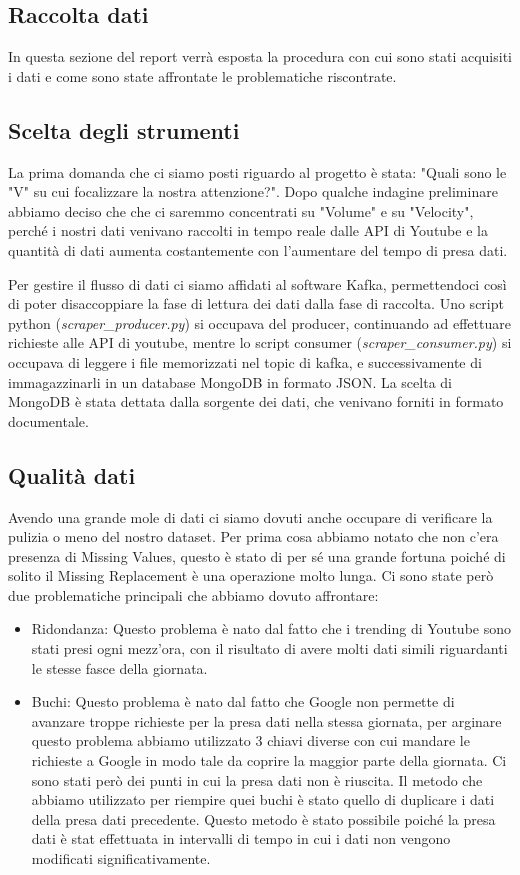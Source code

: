 \documentclass[10pt, a4paper,openany]{article}
\begin{document}
\begin{multicols}{2}
\section*{Raccolta dati}

In questa sezione del report verrà esposta la procedura con cui sono stati acquisiti i dati e come sono state affrontate le problematiche riscontrate.
\subsection*{Scelta degli strumenti}
La prima domanda che ci siamo posti riguardo al progetto è stata: "Quali sono le "V" su cui focalizzare la nostra attenzione?".
Dopo qualche indagine preliminare abbiamo deciso che che ci saremmo concentrati su "Volume" e su "Velocity", perché i nostri dati venivano raccolti in tempo reale dalle API di Youtube e la quantità di dati aumenta costantemente con l'aumentare del tempo di presa dati.

Per gestire il flusso di dati ci siamo affidati al software Kafka, permettendoci così di poter disaccoppiare la fase di lettura dei dati dalla fase di  raccolta. Uno script python (\textit{scraper\_producer.py}) si occupava del producer, continuando ad effettuare richieste alle API di youtube, mentre lo script consumer (\textit{scraper\_consumer.py}) si occupava di leggere i file memorizzati nel topic di kafka, e successivamente di immagazzinarli in un database MongoDB in formato JSON. La scelta di MongoDB è stata dettata dalla sorgente dei dati, che venivano forniti in formato documentale.
 
\subsection*{Qualità dati}

Avendo una grande mole di dati ci siamo dovuti anche occupare di verificare la pulizia o meno del nostro dataset. Per prima cosa abbiamo notato che non c'era presenza di Missing Values, questo è stato di per sé una grande fortuna poiché di solito il Missing Replacement è una operazione molto lunga.  Ci sono state però due problematiche principali che abbiamo dovuto affrontare:
\begin{itemize}
	\item Ridondanza: Questo problema è nato dal fatto che i trending di Youtube sono stati presi ogni mezz'ora, con il risultato di avere molti dati simili riguardanti le stesse fasce della giornata. 
	\item Buchi: Questo problema è nato dal fatto che Google non permette di avanzare troppe richieste per la presa dati nella stessa giornata, per arginare questo problema abbiamo utilizzato 3 chiavi diverse con cui mandare le richieste a Google in modo tale da coprire la maggior parte della giornata. Ci sono stati però dei punti in cui la presa dati non è riuscita. Il metodo che abbiamo utilizzato per riempire quei buchi è stato quello di duplicare i dati della presa dati precedente. Questo metodo è stato possibile poiché la presa dati è stat effettuata in intervalli di tempo in cui i dati non vengono modificati significativamente.
	

\end{itemize}
\end{multicols}
\end{document}
